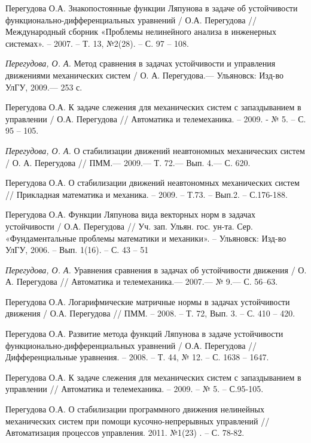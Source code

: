 \begin{thebibliography}{10}
	Перегудова О.А. Знакопостоянные функции Ляпунова в задаче об устойчивости функционально-дифференциальных уравнений / О.А. Перегудова // Международный сборник «Проблемы нелинейного анализа в инженерных системах». – 2007. – Т. 13, №2(28). – С. 97 – 108.
	
	{\it Перегудова, О. А.} Метод сравнения в задачах устойчивости и управления движениями
	механических систем / О. А. Перегудова.— Ульяновск: Изд-во УлГУ, 2009.— 253 с.
	
	Перегудова О.А. К задаче слежения для механических систем с запаздыванием в управлении / О.А. Перегудова // Автоматика и телемеханика. – 2009. - № 5. – С. 95 – 105.
	
	{\it Перегудова, О. А.} О стабилизации движений неавтономных механических систем / О. А. Перегудова // ПММ.—  2009.— Т. 72.— Вып. 4.— С. 620.
	
	Перегудова О.А. О стабилизации движений неавтономных механических систем // Прикладная математика и механика. – 2009. – Т.73. – Вып.2. – С.176-188.
	
	Перегудова О.А. Функции Ляпунова вида векторных норм в задачах устойчивости / О.А. Перегудова // Уч. зап. Ульян. гос. ун-та. Сер. «Фундаментальные проблемы математики и механики». – Ульяновск: Изд-во УлГУ, 2006. – Вып. 1(16). – С. 43 – 51
	
	{\it Перегудова, О. А.} Уравнения сравнения в задачах об устойчивости движения / О. А. Перегудова // Автоматика и телемеханика.—  2007.— № 9.— С. 56–63.
	
	Перегудова О.А. Логарифмические матричные нормы в задачах устойчивости движения / О.А. Перегудова // ПММ. – 2008. – Т. 72, Вып. 3. – С. 410 – 420.
	
	Перегудова О.А. Развитие метода функций Ляпунова в задаче устойчивости функционально-дифференциальных уравнений / О.А. Перегудова // Дифференциальные уравнения. – 2008. – Т. 44, № 12. – С. 1638 – 1647.
	
	Перегудова О.А. К задаче слежения для механических систем с запаздыванием в
	управлении // Автоматика и телемеханика. – 2009. – № 5. – С.95-105.
	
	Перегудова О.А. О стабилизации программного движения нелинейных механических систем при помощи кусочно-непрерывных управлений // Автоматизация процессов управления. 2011. №1(23) . – С. 78-82.
	

\end{thebibliography}
